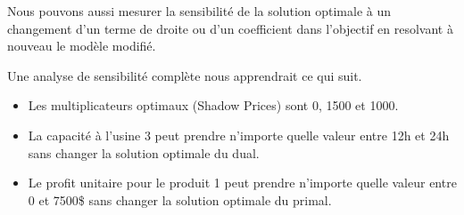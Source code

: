 Nous pouvons aussi mesurer la sensibilité de la solution optimale à un changement d'un terme de droite ou d'un coefficient dans l'objectif en resolvant à nouveau le modèle modifié.

\begin{example}
Une analyse de sensibilité complète nous apprendrait ce qui suit.
\begin{itemize}
\item
Les multiplicateurs optimaux (Shadow Prices) sont 0, 1500
et 1000.
\item
La capacité à l'usine 3 peut prendre n'importe quelle valeur entre 12h et 24h sans changer la solution optimale du dual.
\item
Le profit unitaire pour le produit 1 peut prendre n'importe quelle valeur entre 0 et 7500\$ sans changer la solution optimale du primal.
\end{itemize}
\end{example}

